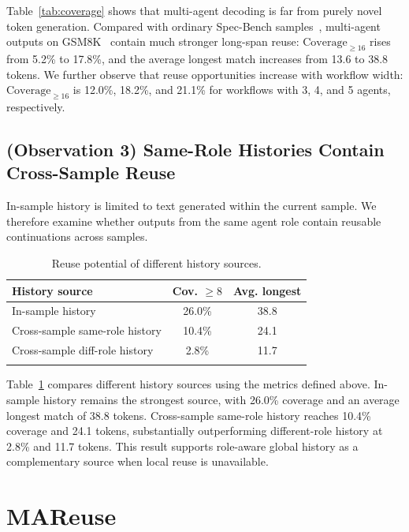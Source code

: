 \documentclass[letterpaper]{article} %
\begin{document}
Table~\ref{tab:coverage} shows that multi-agent decoding is far from purely novel token generation. Compared with ordinary Spec-Bench samples~\citep{xia2024unlocking}, multi-agent outputs on GSM8K~\citep{cobbe2021training} contain much stronger long-span reuse: $\mathrm{Coverage}_{\ge16}$ rises from 5.2\% to 17.8\%, and the average longest match increases from 13.6 to 38.8 tokens. We further observe that reuse opportunities increase with workflow width: $\mathrm{Coverage}_{\ge16}$ is 12.0\%, 18.2\%, and 21.1\% for workflows with 3, 4, and 5 agents, respectively.

\subsection{(Observation 3) Same-Role Histories Contain Cross-Sample Reuse}

In-sample history is limited to text generated within the current sample. We therefore examine whether outputs from the same agent role contain reusable continuations across samples.

\begin{table}[t]
\centering
\setlength{\tabcolsep}{3pt}
\begin{tabular}{lcc}
\hline
\addlinespace[1pt]
History source & Cov. $\ge8$ & Avg. longest \\
\hline
\addlinespace[1pt]
In-sample history & 26.0\% & 38.8 \\
\addlinespace[1pt]
Cross-sample same-role history & 10.4\% & 24.1 \\
\addlinespace[1pt]
Cross-sample diff-role history & 2.8\% & 11.7 \\
\addlinespace[1pt]
\hline
\end{tabular}
\caption{Reuse potential of different history sources.}
\label{tab:cross-sample-reuse}
\end{table}

Table~\ref{tab:cross-sample-reuse} compares different history sources using the metrics defined above. In-sample history remains the strongest source, with 26.0\% coverage and an average longest match of 38.8 tokens. Cross-sample same-role history reaches 10.4\% coverage and 24.1 tokens, substantially outperforming different-role history at 2.8\% and 11.7 tokens. This result supports role-aware global history as a complementary source when local reuse is unavailable.

\section{MAReuse}
\end{document}

